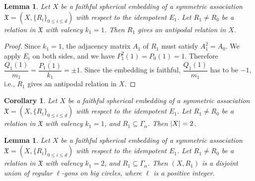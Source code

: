 \documentclass[12pt]{amsart}
\newtheorem{corollary}[theorem]{Corollary}
\newtheorem{lemma}[theorem]{Lemma}
\DeclarePairedDelimiter{\abs}{\vert}{\vert}
\begin{document}
			
	\begin{lemma} \label{lem:Stool}
		Let $X$ be a faithful spherical embedding of a symmetric association $\mathfrak X=(X,\{R_i\}_{0\leq i\leq d})$ with respect to the idempotent $E_1$. Let $R_1 \neq R_0$ be a relation in $\mathfrak{X}$ with valency $k_1 = 1$. Then $R_1$ gives an antipodal relation in $X$. 
	\end{lemma}

	\begin{proof}
		Since $k_1 = 1$, the adjacency matrix $A_1$ of $R_1$ must satisfy $A_1^2 = A_0$. We apply $E_i$ on both sides, and we have $P^2_1(1) = P_0(1) = 1$. Therefore $\dfrac{Q_1(1)}{m_1} = \dfrac{\overline{P_1(1)}}{k_1} = \pm 1$. Since the embedding is faithful, $\dfrac{Q_1(1)}{m_1}$ has to be $-1$, i.e., $R_1$ gives an antipodal relation in $X$. 
	\end{proof}

	\begin{corollary} \label{coro:Moonscape}
		Let $X$ be a faithful spherical embedding of a symmetric association $\mathfrak X=(X,\{R_i\}_{0\leq i\leq d})$ with respect to the idempotent $E_1$. Let $R_1 \neq R_0$ be a relation in $\mathfrak{X}$ with valency $k_1 = 1$, and $R_1 \subseteq \Gamma_\alpha$. Then $\abs{X}=2$.
	\end{corollary}

					
	\begin{lemma} \label{lem:Salmon}
		Let $X$ be a faithful spherical embedding of a symmetric association $\mathfrak X=(X,\{R_i\}_{0\leq i\leq d})$ with respect to the idempotent $E_1$. Let $R_1 \neq R_0$ be a relation in $\mathfrak{X}$ with valency $k_1 = 2$, and $R_1 \subseteq \Gamma_\alpha$. Then $(X,R_1)$ is a disjoint union of regular $\ell$-gons on big circles, where $\ell$ is a positive integer.
	\end{lemma}
\end{document}
